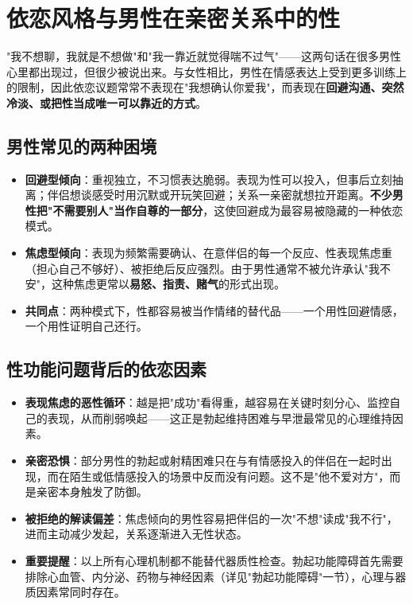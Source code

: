 \section{依恋风格与男性在亲密关系中的性}

"我不想聊，我就是不想做"和"我一靠近就觉得喘不过气"——这两句话在很多男性心里都出现过，但很少被说出来。与女性相比，男性在情感表达上受到更多训练上的限制，因此依恋议题常常不表现在"我想确认你爱我"，而表现在\textbf{回避沟通、突然冷淡、或把性当成唯一可以靠近的方式}。

\subsection{男性常见的两种困境}

\begin{itemize}
	\item \textbf{回避型倾向}：重视独立，不习惯表达脆弱。表现为性可以投入，但事后立刻抽离；伴侣想谈感受时用沉默或开玩笑回避；关系一亲密就想拉开距离。\textbf{不少男性把"不需要别人"当作自尊的一部分}，这使回避成为最容易被隐藏的一种依恋模式。
	\item \textbf{焦虑型倾向}：表现为频繁需要确认、在意伴侣的每一个反应、性表现焦虑重（担心自己不够好）、被拒绝后反应强烈。由于男性通常不被允许承认"我不安"，这种焦虑更常以\textbf{易怒、指责、赌气}的形式出现。
	\item \textbf{共同点}：两种模式下，性都容易被当作情绪的替代品——一个用性回避情感，一个用性证明自己还行。
\end{itemize}

\subsection{性功能问题背后的依恋因素}

\begin{itemize}
	\item \textbf{表现焦虑的恶性循环}：越是把"成功"看得重，越容易在关键时刻分心、监控自己的表现，从而削弱唤起——这正是勃起维持困难与早泄最常见的心理维持因素。
	\item \textbf{亲密恐惧}：部分男性的勃起或射精困难只在与有情感投入的伴侣在一起时出现，而在陌生或低情感投入的场景中反而没有问题。这不是"他不爱对方"，而是亲密本身触发了防御。
	\item \textbf{被拒绝的解读偏差}：焦虑倾向的男性容易把伴侣的一次"不想"读成"我不行"，进而主动减少发起，关系逐渐进入无性状态。
	\item \textbf{重要提醒}：以上所有心理机制都不能替代器质性检查。勃起功能障碍首先需要排除心血管、内分泌、药物与神经因素（详见"勃起功能障碍"一节），心理与器质因素常同时存在。
\end{itemize}

